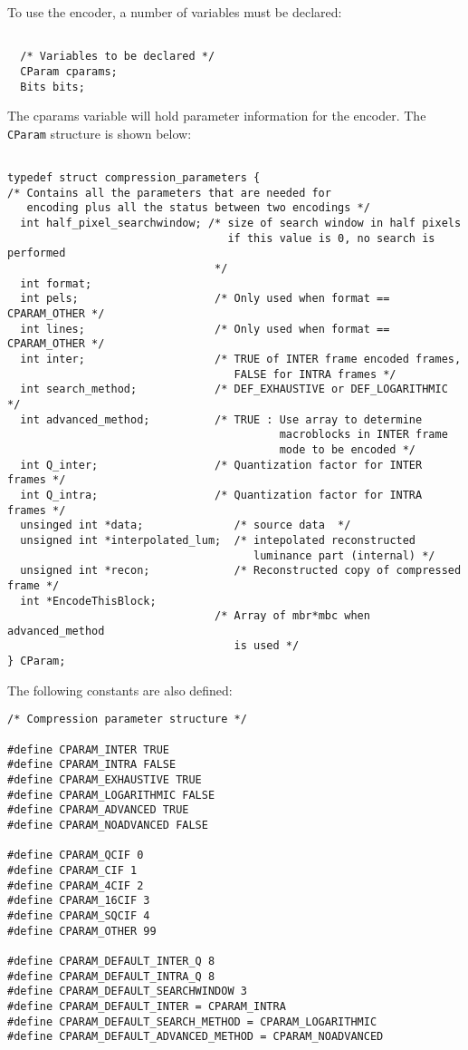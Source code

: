 \documentclass{article}
\begin{document}
To use the encoder, a number of variables must be declared:

\begin{verbatim}

  /* Variables to be declared */                       
  CParam cparams;
  Bits bits;

\end{verbatim}

The cparams variable will hold parameter information for
the encoder. The \texttt{CParam} structure is shown below:

\begin{verbatim}

typedef struct compression_parameters {
/* Contains all the parameters that are needed for 
   encoding plus all the status between two encodings */
  int half_pixel_searchwindow; /* size of search window in half pixels
                                  if this value is 0, no search is performed
                                */
  int format;                   
  int pels;                     /* Only used when format == CPARAM_OTHER */
  int lines;                    /* Only used when format == CPARAM_OTHER */
  int inter;                    /* TRUE of INTER frame encoded frames,
                                   FALSE for INTRA frames */
  int search_method;            /* DEF_EXHAUSTIVE or DEF_LOGARITHMIC */
  int advanced_method;          /* TRUE : Use array to determine 
                                          macroblocks in INTER frame
                                          mode to be encoded */
  int Q_inter;                  /* Quantization factor for INTER frames */
  int Q_intra;                  /* Quantization factor for INTRA frames */
  unsinged int *data;              /* source data  */
  unsigned int *interpolated_lum;  /* intepolated reconstructed
                                      luminance part (internal) */
  unsigned int *recon;             /* Reconstructed copy of compressed frame */
  int *EncodeThisBlock; 
                                /* Array of mbr*mbc when advanced_method 
                                   is used */
} CParam;

\end{verbatim}

The following constants are also defined:

\begin{verbatim}
/* Compression parameter structure */

#define CPARAM_INTER TRUE
#define CPARAM_INTRA FALSE
#define CPARAM_EXHAUSTIVE TRUE
#define CPARAM_LOGARITHMIC FALSE
#define CPARAM_ADVANCED TRUE
#define CPARAM_NOADVANCED FALSE

#define CPARAM_QCIF 0
#define CPARAM_CIF 1
#define CPARAM_4CIF 2
#define CPARAM_16CIF 3
#define CPARAM_SQCIF 4
#define CPARAM_OTHER 99

#define CPARAM_DEFAULT_INTER_Q 8
#define CPARAM_DEFAULT_INTRA_Q 8
#define CPARAM_DEFAULT_SEARCHWINDOW 3
#define CPARAM_DEFAULT_INTER = CPARAM_INTRA
#define CPARAM_DEFAULT_SEARCH_METHOD = CPARAM_LOGARITHMIC
#define CPARAM_DEFAULT_ADVANCED_METHOD = CPARAM_NOADVANCED

\end{verbatim}
\end{document}
